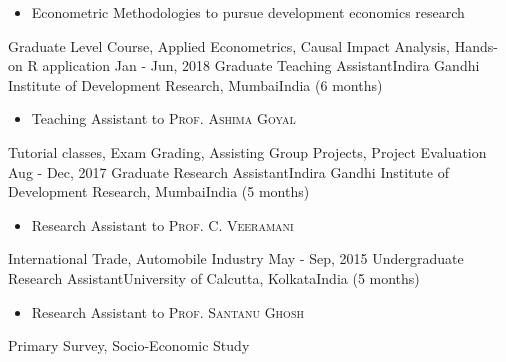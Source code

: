 \begin{experiences}
{\begin{itemize}
                        \item Econometric Methodologies to pursue development economics research
                      \end{itemize}
                    }
                    {Graduate Level Course, Applied Econometrics, Causal Impact Analysis, Hands-on R application}
\emptySeparator
  \texperience
    {Jan - Jun, 2018}   {Graduate Teaching Assistant}{Indira Gandhi Institute of Development Research, Mumbai}{India}
    {(6 months)} {
                      \begin{itemize}
                        \item Teaching Assistant to \textsc{Prof. Ashima Goyal}             
                      \end{itemize}
                    }
                    {Tutorial classes, Exam Grading, Assisting Group Projects, Project Evaluation}
\emptySeparator
  \texperience
    {Aug - Dec, 2017}   {Graduate Research Assistant}{Indira Gandhi Institute of Development Research, Mumbai}{India}
    {(5 months)} {
                      \begin{itemize}
                        \item Research Assistant to \textsc{Prof. C. Veeramani}             
                      \end{itemize}
                    }
                    {International Trade, Automobile Industry}
\emptySeparator
  \texperience
    {May - Sep, 2015}   {Undergraduate Research Assistant}{University of Calcutta, Kolkata}{India}
    {(5 months)} {
                      \begin{itemize}
                        \item Research Assistant to \textsc{Prof. Santanu Ghosh}             
                      \end{itemize}
                    }
                    {Primary Survey, Socio-Economic Study}
\end{experiences}